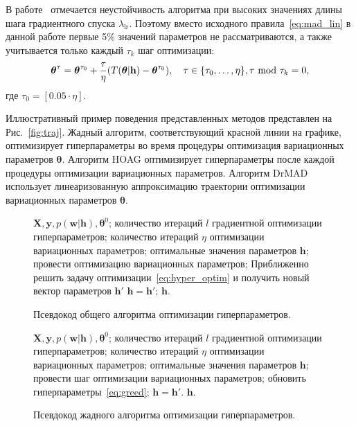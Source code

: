 В работе~\cite{hyper_mad} отмечается неустойчивость алгоритма при высоких значениях длины шага градиентного спуска $ \lambda_{\text{lr}}$. Поэтому вместо исходного правила~\eqref{eq:mad_lin} в данной работе первые 5\% значений параметров не рассматриваются, а также учитывается только каждый $\tau_k$ шаг оптимизации:
\begin{equation}
\label{eq:mad_lin2}
\boldsymbol{\theta}^\tau = \boldsymbol{\theta}^{\tau_0} + \frac{\tau}{\eta} (T(\boldsymbol{\theta}|\mathbf{h})-\boldsymbol{\theta}^{\tau_0}), \quad \tau \in \{\tau_0,\dots,\eta\}, \tau \text{ mod } \tau_k = 0,
\end{equation}
где $\tau_0 = [0.05 \cdot \eta]$.

Иллюстративный пример поведения представленных методов представлен на Рис.~\ref{fig:traj}. Жадный алгоритм, соответствующий красной линии на графике, оптимизирует гиперпараметры во время процедуры оптимизация вариационных параметров $\boldsymbol{\theta}$. Алгоритм HOAG оптимизирует гиперпараметры после каждой процедуры оптимизации вариационных параметров. Алгоритм DrMAD использует линеаризованную аппроксимацию траектории оптимизации вариационных параметров $\boldsymbol{\theta}$. 

\begin{figure}[tbh!]
    \begin{algorithmic}[1]
\REQUIRE $\mathbf{X}, \mathbf{y}, p(\mathbf{w}|\mathbf{h}), \boldsymbol{\theta}^0$;
\REQUIRE количество итераций $l$ градиентной оптимизации гиперпараметров; 
\REQUIRE количество итераций $\eta$ оптимизации вариационных параметров;
\ENSURE оптимальные значения параметров $\mathbf{h}$;
\STATE провести оптимизацию вариационных параметров;
\STATE Приближенно решить задачу оптимизации~\eqref{eq:hyper_optim} и получить новый вектор параметров $\mathbf{h}'$ 
\STATE $\mathbf{h} = \mathbf{h}'$;
\ENDFOR
\RETURN $\mathbf{h}$.
\end{algorithmic}
\caption{Псевдокод общего алгоритма оптимизации гиперпараметров.}
\label{alg:hyperparam_optim}

\end{figure}

\begin{figure}[tbh!]
         \begin{algorithmic}[1]
\REQUIRE $\mathbf{X}, \mathbf{y}, p(\mathbf{w}|\mathbf{h}), \boldsymbol{\theta}^0$;
\REQUIRE количество итераций $l$ градиентной оптимизации гиперпараметров; 
\REQUIRE количество итераций $\eta$ оптимизации вариационных параметров;
\ENSURE оптимальные значения параметров $\mathbf{h}$;
\STATE провести шаг оптимизации вариационных параметров;
\STATE обновить гиперпараметры~\eqref{eq:greed};
\STATE $\mathbf{h} = \mathbf{h}'$.
\ENDFOR
\ENDFOR
\RETURN $\mathbf{h}$.
\end{algorithmic}
\caption{Псевдокод жадного алгоритма оптимизации гиперпараметров.}
\label{alg:greedy}

\end{figure}


